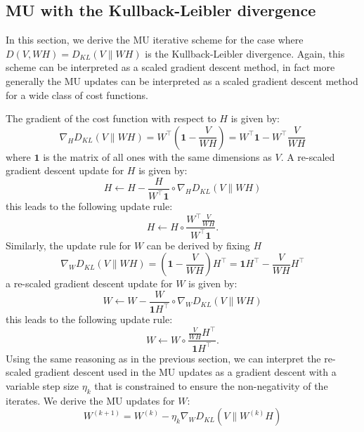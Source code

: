 \subsection{MU with the Kullback-Leibler divergence}
In this section, we derive the MU iterative scheme for the case where
$D(V, WH) = D_{KL}(V \| WH)$ is the Kullback-Leibler divergence. 
Again, this scheme can be interpreted as a scaled gradient descent method, in fact more generally the MU updates can be interpreted as a scaled gradient descent method for a wide class of cost functions.
\par
The gradient of the cost function with respect to \( H \) is given by:
\begin{equation}
    \nabla_H D_{KL}(V \| WH) = W^\top \left(\textbf{1} - \frac{V}{WH} \right) = W^\top \textbf{1} - W^\top \frac{V}{WH}
\end{equation}
where $\textbf{1}$ is the matrix of all ones with the same dimensions as $V.$
A re-scaled gradient descent update for \( H \) is given by:
\begin{equation}
    H \leftarrow H - \frac{H}{W^\top \textbf{1}} \circ \nabla_H D_{KL}(V \| WH)
\end{equation}
this leads to the following update rule:
\begin{equation}
    H \leftarrow H \circ \frac{W^\top \frac{V}{WH}}{W^\top \textbf{1}}.
\end{equation}
Similarly, the update rule for \( W \) can be derived by fixing \( H \)
\begin{equation}
    \nabla_W D_{KL}(V \| WH) = \left(\textbf{1} - \frac{V}{WH} \right) H^\top = \textbf{1} H^\top - \frac{V}{WH} H^\top
\end{equation}
a re-scaled gradient descent update for \( W \) is given by:
\begin{equation}
    W \leftarrow W - \frac{W}{\textbf{1} H^\top} \circ \nabla_W D_{KL}(V \| WH)
\end{equation}
this leads to the following update rule:
\begin{equation}
    W \leftarrow W \circ \frac{\frac{V}{WH} H^\top}{\textbf{1} H^\top}.
\end{equation}
Using the same reasoning as in the previous section, we can interpret the re-scaled gradient descent used in the MU updates as a gradient descent with a variable step size $\eta_k$ that is constrained to ensure the non-negativity of the iterates.
We derive the MU updates for $W$:
\begin{equation} \label{GD MU updates KL}
    W^{(k+1)} = W^{(k)} - \eta_k \nabla_W D_{KL}(V \| W^{(k)}H)
\end{equation}
